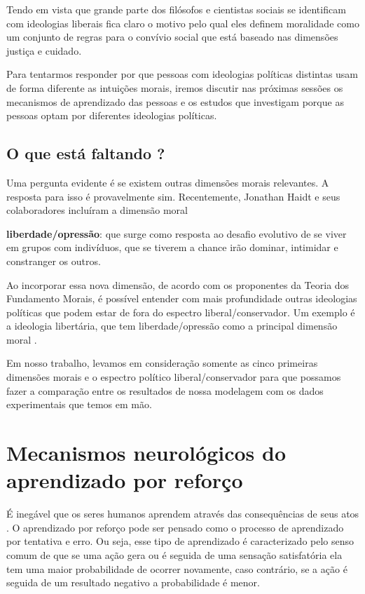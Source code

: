 Tendo em vista que grande parte dos filósofos e cientistas sociais se
identificam com ideologias liberais fica claro o motivo pelo qual eles
definem moralidade como um conjunto de regras para o convívio social que
está baseado nas dimensões justiça e cuidado.

Para tentarmos responder por que pessoas com ideologias políticas distintas
usam de forma diferente as intuições morais, iremos discutir nas próximas
sessões os mecanismos de aprendizado das pessoas e os estudos que investigam
porque as pessoas optam por diferentes ideologias políticas.

\subsection{O que está faltando ?} %

Uma pergunta evidente é se existem outras dimensões morais relevantes. A
resposta para isso é provavelmente sim. Recentemente, Jonathan Haidt e
seus colaboradores incluíram a dimensão moral   
\begin{description}
    \item \textbf{liberdade/opressão}: que surge como resposta ao desafio
        evolutivo de se viver em grupos com indivíduos, que se tiverem a chance
        irão dominar, intimidar e constranger os outros\citep{Haidt2012}. 
\end{description}

Ao incorporar essa nova dimensão, de acordo com os proponentes da Teoria
dos Fundamento Morais, é possível entender com mais profundidade outras
ideologias políticas que podem estar de fora do espectro liberal/conservador.
Um exemplo é a ideologia libertária, que tem liberdade/opressão como a
principal dimensão moral \cite{Iyer2012,Haidt2012}.

Em nosso trabalho, levamos em consideração somente as cinco primeiras
dimensões morais e o espectro político liberal/conservador para que possamos
fazer a comparação entre os resultados de nossa modelagem com os dados
experimentais que temos em mão.

\section{Mecanismos neurológicos do \\aprendizado por reforço} %
\label{sec:ApRe}

É inegável que os seres humanos aprendem através das consequências de
seus atos \citep{Holroyd2002}.  O aprendizado por reforço pode ser pensado
como o processo de aprendizado por tentativa e erro\citep{Shah2012}. Ou seja,
esse tipo de aprendizado é caracterizado  pelo senso comum de que se uma
ação gera ou é seguida de uma sensação satisfatória ela tem uma maior
probabilidade de ocorrer novamente, caso contrário, se a ação é seguida
de um resultado negativo a probabilidade é menor.

